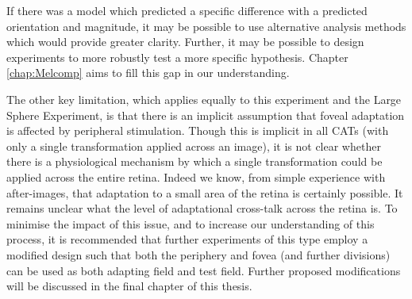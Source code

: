 If there was a model which predicted a specific difference with a predicted orientation and magnitude, it may be possible to use alternative analysis methods which would provide greater clarity. Further, it may be possible to design experiments to more robustly test a more specific hypothesis. Chapter \ref{chap:Melcomp} aims to fill this gap in our understanding.

The other key limitation, which applies equally to this experiment and the Large Sphere Experiment, is that there is an implicit assumption that foveal adaptation is affected by peripheral stimulation. Though this is implicit in all \glspl{CAT} (with only a single transformation applied across an image), it is not clear whether there is a physiological mechanism by which a single transformation could be applied across the entire retina. Indeed we know, from simple experience with after-images, that adaptation to a small area of the retina is certainly possible. It remains unclear what the level of adaptational cross-talk across the retina is. To minimise the impact of this issue, and to increase our understanding of this process, it is recommended that further experiments of this type employ a modified design such that both the periphery and fovea (and further divisions) can be used as both adapting field and test field. Further proposed modifications will be discussed in the final chapter of this thesis.
